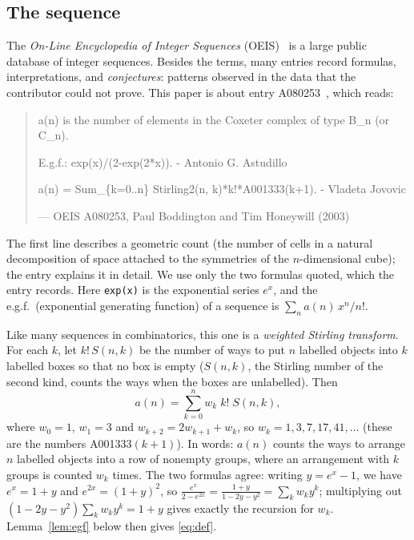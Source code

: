 \documentclass[11pt,a4paper]{article}
\theoremstyle{definition}
\theoremstyle{remark}
\begin{document}
\subsection{The sequence}\label{sec:sequence}
The \emph{On-Line Encyclopedia of Integer Sequences} (OEIS)~\cite{oeisdb} is a large public database of integer sequences.
Besides the terms, many entries record formulas, interpretations, and \emph{conjectures}: patterns observed in the data
that the contributor could not prove. This paper is about entry A080253~\cite{oeis}, which reads:
\begin{quote}\small\ttfamily\raggedright a(n) is the number of elements in the Coxeter complex of type B\_n (or C\_n).\par\smallskip E.g.f.: exp(x)/(2-exp(2*x)). - Antonio G. Astudillo\par\smallskip a(n) = Sum\_\{k=0..n\} Stirling2(n, k)*k!*A001333(k+1). - Vladeta Jovovic\par\smallskip\hfill\textrm{--- OEIS A080253, Paul Boddington and Tim Honeywill (2003)}\end{quote}

The first line describes a geometric count (the number of cells in a natural decomposition of space attached to
the symmetries of the $n$-dimensional cube); the entry explains it in detail. We use only the two formulas quoted, which
the entry records. Here \texttt{exp(x)} is the exponential series $e^x$, and the e.g.f.\ (exponential generating function)
of a sequence is $\sum_na(n)\,x^n/n!$.

Like many sequences in combinatorics, this one is a \emph{weighted Stirling transform}. For each $k$, let
$k!\,S(n,k)$ be the number of ways to put $n$ labelled objects into $k$ labelled boxes so that no box is empty
($S(n,k)$, the Stirling number of the second kind, counts the ways when the boxes are unlabelled). Then
\begin{equation}\label{eq:def}
a(n)=\sum_{k=0}^{n}w_k\;k!\;S(n,k),
\end{equation}
where $w_0=1$, $w_1=3$ and $w_{k+2}=2w_{k+1}+w_k$, so $w_k=1,3,7,17,41,\dots$ (these are the numbers A001333$(k+1)$). In words: $a(n)$ counts the ways to arrange $n$ labelled objects into a row of
nonempty groups, where an arrangement with $k$ groups is counted $w_k$ times. The two formulas agree: writing $y=e^x-1$, we have $e^x=1+y$ and $e^{2x}=(1+y)^2$, so
$\frac{e^x}{2-e^{2x}}=\frac{1+y}{1-2y-y^2}=\sum_kw_ky^k$; multiplying out $(1-2y-y^2)\sum_kw_ky^k=1+y$ gives exactly the
recursion for $w_k$. Lemma~\ref{lem:egf} below then gives \eqref{eq:def}.
\end{document}
